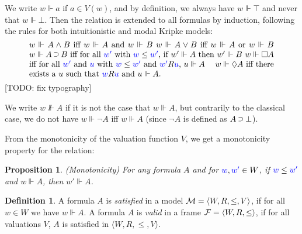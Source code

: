 \documentclass[a4paper]{article}
\theoremstyle{plain}
\newtheorem{proposition}[theorem]{Proposition}
\theoremstyle{definition}
\newtheorem{definition}[theorem]{Definition}
\newcommand{\todo}[1]{{\color{red}[TODO: #1]}}
\newcommand*{\AND}{\mathbin{\wedge}}
\newcommand*{\OR}{\mathbin{\vee}}
\newcommand*{\IMP}{\mathbin{\scalebox{.9}{\raise.2ex\hbox{$\supset$}}}}
\newcommand*{\BOX}{\mathord{\Box}}
\newcommand*{\DIA}{\mathord{\Diamond}}
\newcommand*{\lb}[1]{{\color{blue}{#1}}}
\newcommand*{\accs}[2]{\lb{#1}R\lb{#2}}
\newcommand*{\futs}[2]{\lb{#1}\le{\color{blue}{#2}}}
\newcommand*{\rel}{R}
\begin{document}
We write $w \Vdash a$ if $a \in V(w)$, and by definition, we always have $w \Vdash \top$ and never that $w \Vdash \bot$. 
%
Then the relation is extended to all formulas by induction, following the rules for both intuitionistic and modal Kripke models:
\begin{equation}
\label{eq:kripke}
\parbox{30em}{%
	$w \Vdash A \AND B$ iff $w \Vdash A$ and $w \Vdash B$
	
	$w \Vdash A \OR B$ iff $w \Vdash A$ or $w \Vdash B$
	
	$w \Vdash A \IMP B$ iff for all $\lb{w'}$ with $\futs w{w'}$, if $w' \Vdash A$ then $w' \Vdash B$
	
	$w \Vdash \BOX A$ iff for all $\lb{w'}$ and $\lb u$ with $\futs w{w'}$ and $\accs {w'}u$, $u \Vdash A$ \hfill %
	
	$w \Vdash \DIA A$ iff there exists a $u$ such that $\accs wu$ and $u \Vdash A$.
	
}
\end{equation}
\todo{fix typography}

We write $w \not\Vdash A$ if it is not the case that $w \Vdash A$, but contrarily to the classical case, we do not have $w \Vdash \neg A$ iff $w \Vdash A$ (since $\neg A$ is defined as $A \IMP \bot$).

From the monotonicity of the valuation function $V$, we get a monotonicity property for the relation:
\begin{proposition}(Monotonicity) 
	For any formula $A$ and for $\lb w, \lb{w'} \in W$, if $\futs w{w'}$ and $w \Vdash A$, then $w' \Vdash A$.
\end{proposition}



\begin{definition}
	A formula $A$ is \emph{satisfied} in a model $\M = \langle W, \rel, \le, V \rangle$, if for all $w \in W$ we have $w \Vdash A$.
	A formula $A$ is \emph{valid} in a frame $\F = \langle W, \rel, \le \rangle$, if for all valuations $V$, $A$ is satisfied in $\langle W, R, \le, V \rangle$.
\end{definition}



%
\end{document}
